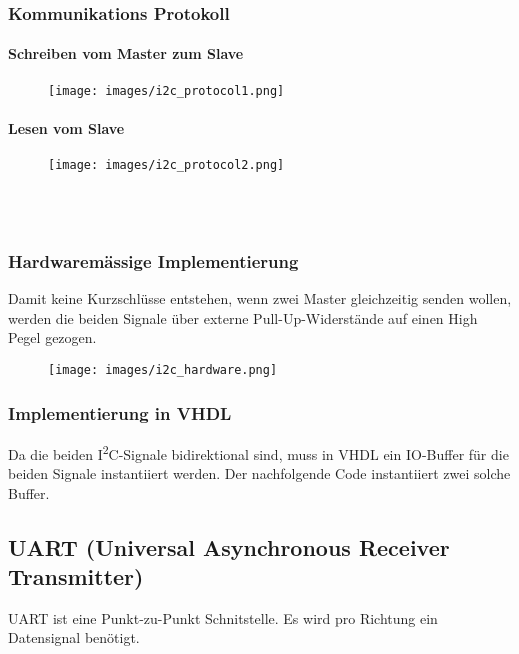 \begin{multicols}{2}
    \subsubsection{Kommunikations Protokoll}
    \paragraph{Schreiben vom Master zum Slave}
    \begin{figure}[H]
        \texttt{[image: images/i2c\_protocol1.png]}
    \end{figure}

    \paragraph{Lesen vom Slave}
    \begin{figure}[H]
        \texttt{[image: images/i2c\_protocol2.png]}
    \end{figure}

    \ \\ \ \\

    \subsubsection{Hardwaremässige Implementierung}
    Damit keine Kurzschlüsse entstehen, wenn zwei Master gleichzeitig senden wollen, werden die beiden Signale über externe Pull-Up-Widerstände auf einen High Pegel gezogen.
    \begin{figure}[H]
        \texttt{[image: images/i2c\_hardware.png]}
    \end{figure}
\end{multicols}

\subsubsection{Implementierung in VHDL}
Da die beiden I\textsuperscript{2}C-Signale bidirektional sind, muss in VHDL ein IO-Buffer für die beiden Signale instantiiert werden. Der nachfolgende Code instantiiert zwei solche Buffer.


\subsection{UART (Universal Asynchronous Receiver Transmitter)}
UART ist eine Punkt-zu-Punkt Schnitstelle. Es wird pro Richtung ein Datensignal benötigt.

